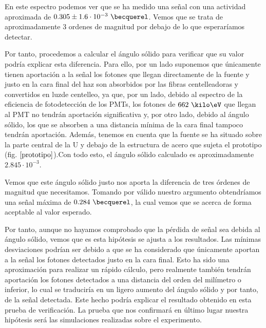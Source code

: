 En este espectro podemos ver que se ha medido una señal con una actividad aproximada de $0.305 \pm 1.6 \cdot 10^{-3}~\becquerel$. Vemos que se trata de aproximadamente 3 ordenes de magnitud por debajo de lo que esperaríamos detectar.

Por tanto, procedemos a calcular el ángulo sólido para verificar que su valor podría explicar esta diferencia. Para ello, por un lado suponemos que únicamente tienen aportación a la señal los fotones que llegan directamente de la fuente y justo en la cara final del haz son absorbidos por las fibras centelleadoras y convertidos en luzde centelleo,  ya que, por un lado, debido al espectro de la eficiencia de fotodetección de los PMTs, los fotones de $662~\kilo\eV$ que llegan al PMT no tendrán aportación significativa y, por otro lado, debido al ángulo sólido, los que se absorben a una distancia mínima de la cara final tampoco tendrán aportación. Además, tenemos en cuenta que la fuente se ha situado sobre la parte central de la U y debajo de la estructura de acero que sujeta el prototipo (fig. $\ref{prototipo}$).Con todo esto, el ángulo sólido calculado es aproximadamente $2.845 \cdotp 10^{-3}$. 

Vemos que este ángulo sólido justo nos aporta la diferencia de tres órdenes de magnitud que necesitamos. Tomando por válido nuestro argumento obtendríamos una señal máxima de $0.284~\becquerel$, la cual vemos que se acerca de forma aceptable al valor esperado.

Por tanto, aunque no hayamos comprobado que la pérdida de señal sea debida al ángulo sólido, vemos que es esta hipótesis se ajusta  a los resultados. Las mínimas desviaciones podrían ser debido a que se ha considerado que únicamente aportan a la señal los fotones detectados justo en la cara final. Esto ha sido una aproximación para realizar un rápido cálculo, pero realmente también tendrán aportación los fotones detectados a una distancia del orden del milímetro o inferior, lo cual se traduciría en un ligero aumento del ángulo sólido y por tanto, de la señal detectada. Este hecho podría explicar  el resultado obtenido en esta prueba de verificación. La prueba que nos confirmará en último lugar nuestra hipótesis será las simulaciones realizadas sobre el experimento.
